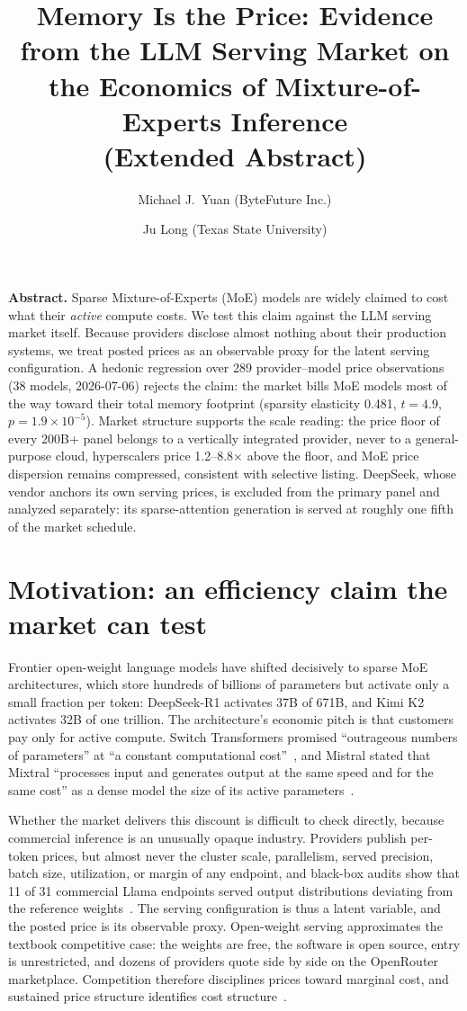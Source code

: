\documentclass[12pt]{article}
\title{Memory Is the Price: Evidence from the LLM Serving Market on the
Economics of Mixture-of-Experts Inference\\[4pt]
\large (Extended Abstract)}
\author{Michael J.\ Yuan (ByteFuture Inc.) \and Ju Long (Texas State University)}
\date{}
\begin{document}
\maketitle

\vspace{0.5em}
\noindent\textbf{Abstract.} Sparse Mixture-of-Experts (MoE) models are widely
claimed to cost what their \emph{active} compute costs. We test this claim
against the LLM serving market itself. Because providers disclose almost
nothing about their production systems, we treat posted prices as an
observable proxy for the latent serving configuration. A hedonic regression
over 289 provider--model price observations (38 models, 2026-07-06) rejects
the claim: the market bills MoE models most of the way toward their total
memory footprint (sparsity elasticity 0.481, $t = 4.9$,
$p = 1.9 \times 10^{-5}$). Market structure supports the scale reading: the price floor of every
200B+ panel belongs to a vertically integrated provider, never to a
general-purpose cloud, hyperscalers price 1.2--8.8$\times$ above the floor,
and MoE price dispersion remains compressed, consistent with selective
listing. DeepSeek, whose vendor anchors its own
serving prices, is excluded from the primary panel and analyzed separately:
its sparse-attention generation is served at roughly one fifth of the
market schedule.

\section{Motivation: an efficiency claim the market can test}

Frontier open-weight language models have shifted decisively to sparse MoE
architectures, which store hundreds of billions of parameters but activate
only a small fraction per token: DeepSeek-R1 activates 37B of 671B, and Kimi
K2 activates 32B of one trillion. The architecture's economic pitch is that
customers pay only for active compute. Switch Transformers promised ``outrageous numbers of parameters'' at ``a constant computational cost''~\cite{fedus}, and Mistral stated that Mixtral ``processes input and
generates output at the same speed and for the same cost'' as a dense model
the size of its active parameters~\cite{mistral}.

Whether the market delivers this discount is difficult to check directly,
because commercial inference is an unusually opaque industry. Providers
publish per-token prices, but almost never the cluster scale, parallelism,
served precision, batch size, utilization, or margin of any endpoint, and
black-box audits show that 11 of 31 commercial Llama endpoints served output
distributions deviating from the reference weights~\cite{gao}. The serving
configuration is thus a latent variable, and the posted price is its
observable proxy. Open-weight serving approximates the textbook competitive case: the weights are free, the software is open source, entry is unrestricted, and dozens of providers quote side by side on the OpenRouter marketplace. Competition therefore disciplines prices toward marginal cost, and sustained price structure identifies cost structure~\cite{hayek}.
\end{document}

